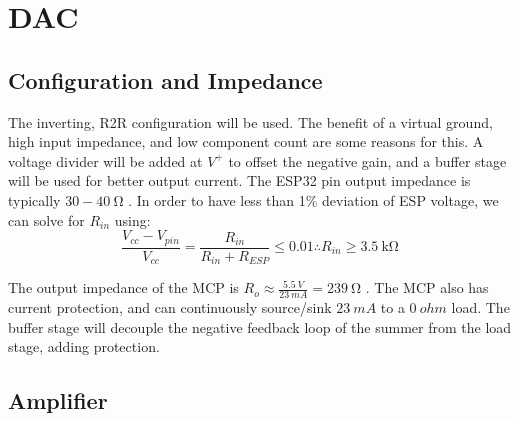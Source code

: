 \graphicspath{{content/2_design/figures/}}
\section{DAC}
\subsection{Configuration and Impedance}

The inverting, R2R configuration will be used. The benefit of a virtual ground, high input impedance,
and low component count are some reasons for this. A voltage divider will be added at $V^+$ to offset the negative gain,
and a buffer stage will be used for better output current.
The ESP32 pin output impedance is typically $30 - \SI{40}{\ohm}$ \cite{datasheetESP}. In order to have less than 1\% deviation of ESP voltage, we can solve for $R_{in}$ using:
$$\frac{V_{cc} - V_{pin}}{V_{cc}} = \frac{R_{in}}{R_{in} + R_{ESP}} \leq 0.01 \therefore R_{in} \geq \SI{3.5}{\kilo\ohm} $$

\noindent The output impedance of the MCP is $R_o \approx \frac{\SI{5.5}{V}}{\SI{23}{mA}} = \SI{239}{\ohm}$ \cite{datasheetMCP6242}. The MCP also has current
protection, and can continuously source/sink $\SI{23}{mA}$ to a $\SI{0}{ohm}$ load. The buffer stage will decouple the negative feedback loop of the summer
from the load stage, adding protection.

\subsection{Amplifier}

